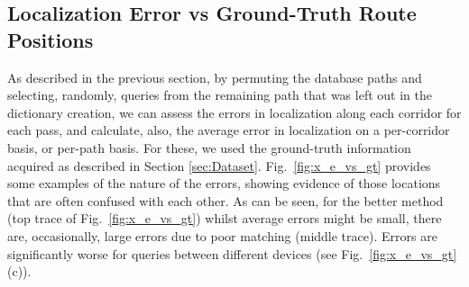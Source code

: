 \subsection{Localization Error vs Ground-Truth Route Positions}
As described in the previous section, by permuting the database paths and selecting, randomly, queries from the remaining path that was left out in the dictionary creation, we can assess the errors  in localization along each corridor for each pass, and calculate, also, the average error in localization on a per-corridor basis, or per-path basis.  For these, we used the ground-truth information acquired as described in Section \ref{sec:Dataset}.  Fig.~\ref{fig:x_e_vs_gt} provides some examples of the nature of the errors, showing evidence of those locations that are often confused with each other.  As can be seen, for the better method (top trace of Fig.~\ref{fig:x_e_vs_gt}) whilst average errors might be small, there are, occasionally, large errors due to poor matching (middle trace). Errors are significantly worse for queries between different devices (see Fig.~\ref{fig:x_e_vs_gt}(c)). 

